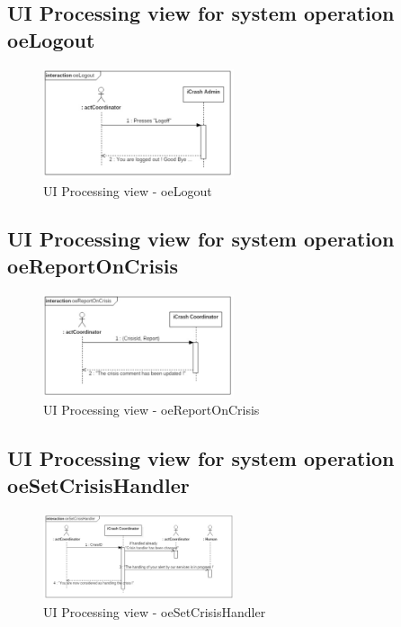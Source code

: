 \subsection{UI Processing view for system operation oeLogout}

\begin{figure}[h]
	\centering	
	\captionsetup{justification=centering}
	\includegraphics[width=0.5\textwidth]{./images/ui_oeLogout.eps}
	\caption{UI Processing view - oeLogout}
\end{figure}


\subsection{UI Processing view for system operation oeReportOnCrisis}

\begin{figure}[h]
	\centering	
	\captionsetup{justification=centering}
	\includegraphics[width=0.5\textwidth]{./images/ui_oeReportOnCrisis.eps}
	\caption{UI Processing view - oeReportOnCrisis}
\end{figure}


\subsection{UI Processing view for system operation oeSetCrisisHandler}

\begin{figure}[h]
	\centering	
	\captionsetup{justification=centering}
	\includegraphics[width=0.5\textwidth]{./images/ui_oeSetCrisisHandler.eps}
	\caption{UI Processing view - oeSetCrisisHandler}
\end{figure}


